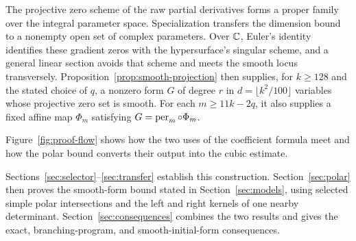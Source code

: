 The projective zero scheme of the raw partial derivatives forms a proper
family over the integral parameter space. Specialization transfers the
dimension bound to a nonempty open set of complex parameters. Over $\mathbb C$,
Euler's identity identifies these gradient zeros with the hypersurface's
singular scheme, and a general linear section avoids that scheme and meets
the smooth locus transversely. Proposition~\ref{prop:smooth-projection}
then supplies, for $k\ge128$ and the stated choice of $q$, a nonzero form
$G$ of degree $r$ in $d=\lfloor k^2/100\rfloor$ variables whose
projective zero set is smooth. For each $m\ge11k-2q$, it also supplies
a fixed affine map $\Phi_m$ satisfying $G=\operatorname{per}_m\circ\Phi_m$.

Figure~\ref{fig:proof-flow} shows how the two uses of the coefficient
formula meet and how the polar bound converts their output into the cubic
estimate.



Sections~\ref{sec:selector}--\ref{sec:transfer} establish this
construction. Section~\ref{sec:polar} then proves the smooth-form bound
stated in Section~\ref{sec:models}, using selected simple polar
intersections and the left and right kernels of one nearby determinant.
Section~\ref{sec:consequences} combines the two results and gives the
exact, branching-program, and smooth-initial-form consequences.

\FloatBarrier
